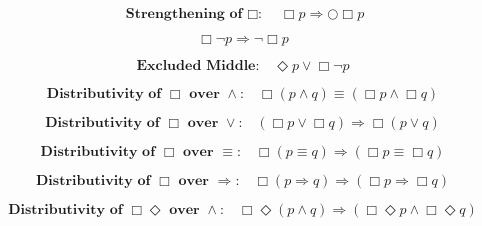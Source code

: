 \documentclass[fleqn, leqno]{article}
\newcommand{\Next}{\bigcirc}
\newcommand{\Event}{\Diamond}
\newcommand{\Always}{\Box}
\newcommand{\spacer}{\vspace{-30pt}}
\begin{document}
\spacer

\begin{equation}\label{E:impAlwaysNA}
\textbf{Strengthening of $\Always$:}\quad \Always p \Rightarrow \Next\Always p
\end{equation}

\spacer

\begin{equation}\label{E:exAlwaysNot}
\Always\lnot p \Rightarrow \lnot\Always p
\end{equation}

\spacer

\begin{equation}\label{E:excludedMid}
\textbf{Excluded Middle:}\quad \Event p \lor \Always\lnot p
\end{equation}

\spacer

\begin{equation}\label{E:distAlwaysAnd}
\textbf{Distributivity of $\Always$ over $\land$:}\quad \Always (p \land q) \equiv (\Always p \land \Always q)
\end{equation}

\spacer

\begin{equation}\label{E:distAlwaysOr}
\textbf{Distributivity of $\Always$ over $\lor$:}\quad (\Always p \lor \Always q) \Rightarrow \Always (p \lor q)
\end{equation}

\spacer

\begin{equation}\label{E:distAlwaysEquiv}
\textbf{Distributivity of $\Always$ over $\equiv$:}\quad \Always(p \equiv q) \Rightarrow (\Always p \equiv \Always q)
\end{equation}

\spacer

\begin{equation}\label{E:distAlwaysImp}
\textbf{Distributivity of $\Always$ over $\Rightarrow$:}\quad \Always (p \Rightarrow q) \Rightarrow (\Always p \Rightarrow \Always q)
\end{equation}

\spacer

\begin{equation}\label{E:distAlwaysEventAnd}
\textbf{Distributivity of $\Always\Event$ over $\land$:}\quad \Always\Event(p \land q) \Rightarrow (\Always\Event p \land \Always\Event q)
\end{equation}

\spacer
\end{document}
